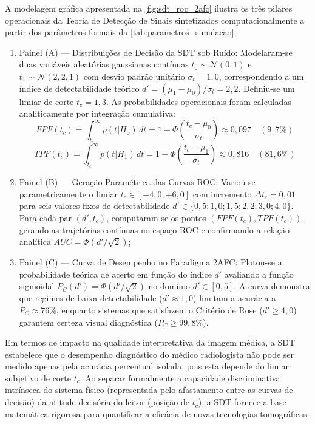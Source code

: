 \documentclass[
  12pt,
  a4paper,
  oneside
]{report}
\begin{document}
A modelagem gráfica apresentada na \cref{fig:sdt_roc_2afc} ilustra os três pilares operacionais da Teoria de Detecção de Sinais sintetizados computacionalmente a partir dos parâmetros formais da \cref{tab:parametros_simulacao}:
\begin{enumerate}
  \item Painel (A) --- Distribuições de Decisão da SDT sob Ruído:
  Modelaram-se duas variáveis aleatórias gaussianas contínuas $t_0 \sim \mathcal{N}(0, 1)$ e $t_1 \sim \mathcal{N}(2{,}2, 1)$ com desvio padrão unitário $\sigma_t = 1{,}0$, correspondendo a um índice de detectabilidade teórico $d' = (\mu_1 - \mu_0)/\sigma_t = 2{,}2$. Definiu-se um limiar de corte $t_c = 1{,}3$. As probabilidades operacionais foram calculadas analiticamente por integração cumulativa:
  \begin{equation}
    FPF(t_c) = \int_{t_c}^\infty p(t|H_0) \, dt = 1 - \Phi\left(\frac{t_c - \mu_0}{\sigma_t}\right) \approx 0{,}097 \quad (9{,}7\%)
  \end{equation}
  \begin{equation}
    TPF(t_c) = \int_{t_c}^\infty p(t|H_1) \, dt = 1 - \Phi\left(\frac{t_c - \mu_1}{\sigma_t}\right) \approx 0{,}816 \quad (81{,}6\%)
  \end{equation}

  \item Painel (B) --- Geração Paramétrica das Curvas ROC:
  Variou-se parametricamente o limiar $t_c \in [-4{,}0; +6{,}0]$ com incremento $\Delta t_c = 0{,}01$ para seis valores fixos de detectabilidade $d' \in \{0{,}5; 1{,}0; 1{,}5; 2{,}2; 3{,}0; 4{,}0\}$. Para cada par $(d', t_c)$, computaram-se os pontos $(FPF(t_c), TPF(t_c))$, gerando as trajetórias contínuas no espaço ROC e confirmando a relação analítica $AUC = \Phi(d' / \sqrt{2})$;

  \item Painel (C) --- Curva de Desempenho no Paradigma 2AFC:
  Plotou-se a probabilidade teórica de acerto em função do índice $d'$ avaliando a função sigmoidal $P_C(d') = \Phi(d' / \sqrt{2})$ no domínio $d' \in [0, 5]$. A curva demonstra que regimes de baixa detectabilidade ($d' \approx 1{,}0$) limitam a acurácia a $P_C \approx 76\%$, enquanto sistemas que satisfazem o Critério de Rose ($d' \ge 4{,}0$) garantem certeza visual diagnóstica ($P_C \ge 99{,}8\%$).
\end{enumerate}

Em termos de impacto na qualidade interpretativa da imagem médica, a SDT estabelece que o desempenho diagnóstico do médico radiologista não pode ser medido apenas pela acurácia percentual isolada, pois esta depende do limiar subjetivo de corte $t_c$. Ao separar formalmente a capacidade discriminativa intrínseca do sistema físico (representada pelo afastamento entre as curvas de decisão) da atitude decisória do leitor (posição de $t_c$), a SDT fornece a base matemática rigorosa para quantificar a eficácia de novas tecnologias tomográficas.
\end{document}
